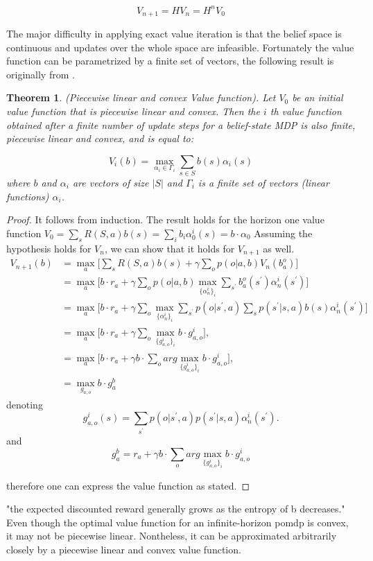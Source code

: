 \documentclass[a4paper,11pt]{report}
\theoremstyle{definition}
\theoremstyle{plain}
\newtheorem{theorem}{Theorem}[section]
\theoremstyle{remark}  %
\begin{document}
$$V_{n+1} = HV_n = H^n V_0$$ 


The major difficulty in applying exact value iteration is that the belief space is continuous and 
updates over the whole space are infeasible. 
Fortunately the value function can be parametrized by a finite set of vectors, the following result 
is originally from \cite{1307539f-051d-3d3c-a0d8-111443bed03f}.

\begin{theorem}
    (Piecewise linear and convex Value function). Let \(V_{0}\) be an initial value function
    that is piecewise linear and convex. Then the \(i\) th value function obtained after a finite
    number of update steps for a belief-state MDP is also finite, piecewise linear and convex,
    and is equal to:
   
   \[
   V_{i}(b)=\max _{\alpha_{i} \in \Gamma_{i}} \sum_{s \in S} b(s) \alpha_{i}(s)
   \]
    where \(b\) and \(\alpha_{i}\) are vectors of size \(|S|\) and \(\Gamma_{i}\) is a finite set of vectors (linear functions) \(\alpha_{i}\).
\end{theorem}
\begin{proof}
It follows from induction. The result holds for the horizon one value function
$V_0 = \sum_s R(S,a)b(s)= \sum_{i}b_i\alpha_{0}^{i}(s)= b \cdot \alpha_0 $
Assuming the hypothesis holds for \(V_n\), we can show that it holds for \(V_{n+1}\) as well.
\begin{align*}
    V_{n+1}(b)&=\displaystyle\max_{a}\Big[\sum_s R(S,a)b(s)+\gamma\sum_{o}p(o|a,b)V_{n}(b_{a}^{o})\Big] \nonumber\\
    &=\displaystyle\max_{a}\Big[b\cdot r_{a}+\gamma\sum_{o}p(o|a,b)\max_{\{\alpha_{n}^{i}\}_{i}}\sum_{s^{\prime}}b_{a}^{o}(s^{\prime})\alpha_{n}^{i}(s^{\prime})\Big] \nonumber\\
    &=\displaystyle\max_{a}\Big[b\cdot r_{a}+\gamma\sum_{o}\max_{\{\alpha_{n}^{i}\}_{i}}\sum_{s^{\prime}}p(o|s^{\prime},a)\sum_{s}p(s^{\prime}|s,a)b(s)\alpha_{n}^{i}(s^{\prime})\Big] \nonumber\\
    &=\displaystyle\max_{a}\Big[b\cdot r_{a}+\gamma\sum_{o}\max_{\{g_{a,o}^{i}\}_{i}}b\cdot g_{a,o}^{i}\Big], \nonumber\\
    &=\displaystyle\max_{a}\Big[b\cdot r_{a}+\gamma b \cdot \sum_o arg\max_{\{g_{a,o}^{i}\}_{i}}b\cdot g_{a,o}^{i}\Big], \nonumber\\
    &=\displaystyle\max_{g_{a,o}}b \cdot g_a^b \nonumber
\end{align*}
denoting 
\[
\quad g_{a,o}^{i}(s)=\sum_{s^{\prime }}p(o|s^{\prime },a)p(s^{\prime
}|s,a)\alpha _{n}^{i}(s^{\prime }).\quad  
\]
and 
$$g_a^b = r_{a}+\gamma b \cdot \sum_o arg\max_{\{g_{a,o}^{i}\}_{i}}b\cdot g_{a,o}^{i} $$

therefore one can express the value function as stated.

\end{proof}
"the expected discounted reward generally grows as the entropy
of b decreases."
Even though the optimal value function for an infinite-horizon
\gls{pomdp} is convex, it may not be piecewise linear. Nontheless, it can be approximated
arbitrarily closely by a piecewise linear and convex value function.
\end{document}
